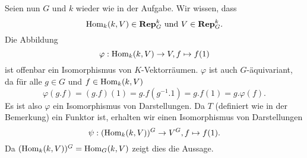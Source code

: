 \documentclass[a4paper,10pt]{article}
\begin{document}
Seien nun $G$ und $k$ wieder wie in der Aufgabe. Wir wissen, dass
\[
 \operatorname{Hom}_k(k,V) \in \mathbf{Rep}_G^k \text{ und } V \in \mathbf{Rep}_G^k.
\]
Die Abbildung 
\[
 \varphi: \operatorname{Hom}_k(k,V) \to V, f \mapsto f(1)
\]
ist offenbar ein Isomorphismus von $K$-Vektorräumen. $\varphi$ ist auch $G$-äquivariant, da für alle $g \in G$ und $f \in \operatorname{Hom}_k(k,V)$
\[
 \varphi(g.f) = (g.f)(1) = g.f(g^{-1}.1) = g.f(1) = g.\varphi(f).
\]
Es ist also $\varphi$ ein Isomorphismus von Darstellungen. Da $T$ (definiert wie in der Bemerkung) ein Funktor ist, erhalten wir einen Isomorphismus von Darstellungen
\[
 \psi : (\operatorname{Hom}_k(k,V))^G \to V^G, f \mapsto f(1).
\]
Da $(\operatorname{Hom}_k(k,V))^G = \operatorname{Hom}_G(k,V)$ zeigt dies die Aussage.
\end{document}
